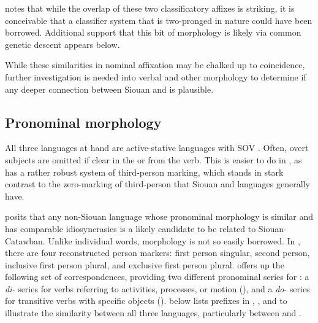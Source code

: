 \documentclass[output=paper]{LSP/langsci}
\begin{document}
\citet{Rankin1998scy} notes that while the overlap of these two classificatory affixes is striking, it is conceivable that a classifier system that is two-pronged in nature could have been borrowed. Additional support that this bit of morphology is likely via common genetic descent appears below.

While these similarities in nominal affixation may be chalked up to coincidence, further investigation is needed into verbal and other morphology to determine if any deeper connection between Siouan and  is plausible.

\subsection{Pronominal morphology}

All three languages at hand are active-stative languages with SOV . Often, overt subjects are omitted if clear in the  or from the verb. This is easier to do in , as  has a rather robust system of third-person marking, which stands in stark contrast to the zero-marking of third-person that Siouan and  languages generally have.

\citet{Rankin1996,Rankin1998scy} posits that any non-Siouan language whose pronominal morphology is similar and has comparable idiosyncrasies is a likely candidate to be related to Siouan-Catawban. Unlike individual words, morphology is not so easily borrowed. In , there are four reconstructed person markers: first person singular, second person, inclusive first person plural, and exclusive first person plural. \citet{Rankin1998scy} offers up the following set of correspondences, providing two different pronominal series for : a \emph{di-} series for verbs referring to activities, processes, or motion (\citealt[130]{Linn2000}), and a \emph{do}- series for transitive verbs with specific objects (\citealt[178]{Linn2000}).  below lists  prefixes in , , and  to illustrate the similarity between all three languages, particularly between  and .
\end{document}
